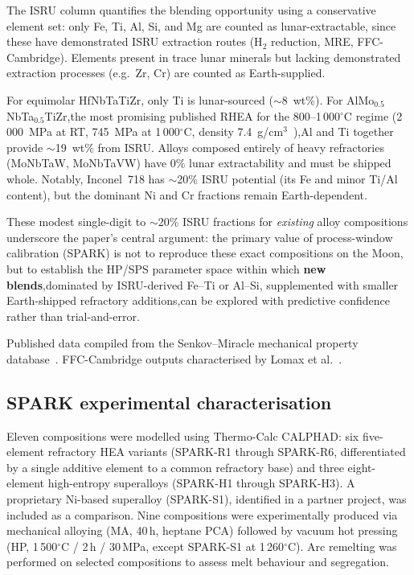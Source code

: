 \documentclass[11pt,a4paper]{article}
\begin{document}
The ISRU column quantifies the blending opportunity using a conservative element set: only Fe, Ti, Al, Si, and Mg are counted as lunar-extractable, since these have demonstrated ISRU extraction routes (H$_2$ reduction, MRE, FFC-Cambridge). Elements present in trace lunar minerals but lacking demonstrated extraction processes (e.g.\ Zr, Cr) are counted as Earth-supplied.

For equimolar HfNbTaTiZr, only Ti is lunar-sourced ($\sim$8~wt\%). For AlMo$_{0.5}$NbTa$_{0.5}$TiZr,the most promising published RHEA for the 800--1\,000$^\circ$C regime (2\,000~MPa at RT, 745~MPa at 1\,000$^\circ$C, density 7.4~g/cm$^3$~\cite{Senkov2018}),Al and Ti together provide $\sim$19~wt\% from ISRU. Alloys composed entirely of heavy refractories (MoNbTaW, MoNbTaVW) have 0\% lunar extractability and must be shipped whole. Notably, Inconel~718 has $\sim$20\% ISRU potential (its Fe and minor Ti/Al content), but the dominant Ni and Cr fractions remain Earth-dependent.

These modest single-digit to $\sim$20\% ISRU fractions for \emph{existing} alloy compositions underscore the paper's central argument: the primary value of process-window calibration (SPARK) is not to reproduce these exact compositions on the Moon, but to establish the HP/SPS parameter space within which \textbf{new blends},dominated by ISRU-derived Fe--Ti or Al--Si, supplemented with smaller Earth-shipped refractory additions,can be explored with predictive confidence rather than trial-and-error.

Published data compiled from the Senkov--Miracle mechanical property database~\cite{SenkovMiracleData2018,Senkov2018,Senkov2011}. FFC-Cambridge outputs characterised by Lomax et al.~\cite{Lomax2020}.

\subsection{SPARK experimental characterisation}
\label{subsec:spark_results}

Eleven compositions were modelled using Thermo-Calc CALPHAD: six five-element refractory HEA variants (SPARK-R1 through SPARK-R6, differentiated by a single additive element to a common refractory base) and three eight-element high-entropy superalloys (SPARK-H1 through SPARK-H3). A proprietary Ni-based superalloy (SPARK-S1), identified in a partner project, was included as a comparison. Nine compositions were experimentally produced via mechanical alloying (MA, 40\,h, heptane PCA) followed by vacuum hot pressing (HP, 1\,500$^\circ$C / 2\,h / 30\,MPa, except SPARK-S1 at 1\,260$^\circ$C). Arc remelting was performed on selected compositions to assess melt behaviour and segregation.
\end{document}
